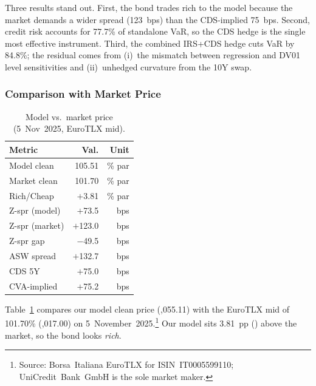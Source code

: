 \documentclass[11pt,a4paper]{article}
\begin{document}
Three results stand out.
First, the bond trades  rich to the model because
the market demands a wider spread (123~bps) than the
CDS-implied 75~bps.
Second, credit risk accounts for 77.7\% of standalone VaR,
so the CDS hedge is the single most effective instrument.
Third, the combined IRS+CDS hedge cuts VaR by 84.8\%;
the residual comes from
(i)~the mismatch between regression and DV01 level sensitivities and
(ii)~unhedged curvature from the 10Y swap.

\subsubsection{Comparison with Market Price}
\label{sssec:q10_market}

\begin{table}
  \vspace{-10pt}
  \centering\scriptsize
  \setlength{\tabcolsep}{2pt}
  \begin{tabular}{@{}lrr@{}}
    \toprule
    \textbf{Metric} & \textbf{Val.} & \textbf{Unit} \\
    \midrule
    Model clean       & 105.51 & \% par \\
    Market clean      & 101.70 & \% par \\
    Rich/Cheap        & $+$3.81 & \% par \\
    \midrule
    Z-spr (model)     & $+$73.5 & bps \\
    Z-spr (market)    & $+$123.0 & bps \\
    Z-spr gap         & $-$49.5 & bps \\
    \midrule
    ASW spread        & $+$132.7 & bps \\
    CDS 5Y            & $+$75.0 & bps \\
    CVA-implied       & $+$75.2 & bps \\
    \bottomrule
  \end{tabular}
  \vspace{2pt}
  \caption{Model vs.\ market price
    (5~Nov~2025, EuroTLX mid).}
  \label{tab:q10_comparison}
  \vspace{-8pt}
\end{table}

Table~\ref{tab:q10_comparison} compares our model clean price
(,055.11) with the EuroTLX mid of 101.70\%
(,017.00) on 5~November~2025.\footnote{Source:
Borsa~Italiana EuroTLX for ISIN~IT0005599110;
UniCredit~Bank~GmbH is the sole market maker.}
Our model sits 3.81~pp () above the market,
so the bond looks \emph{rich}.
\end{document}
